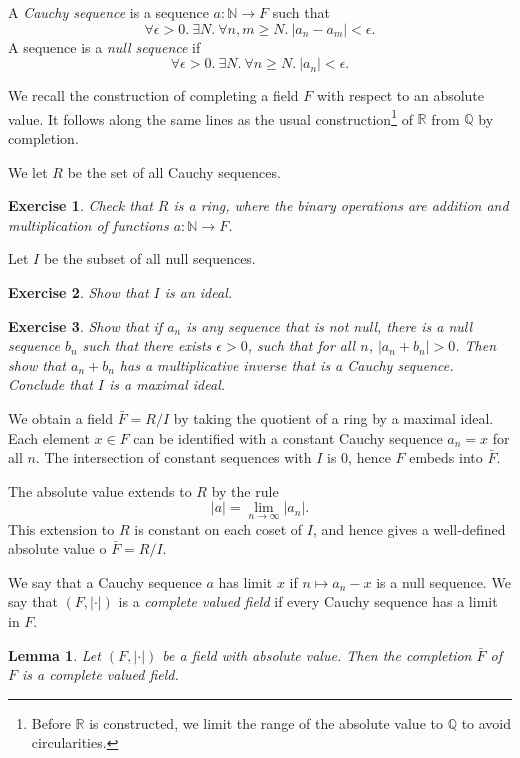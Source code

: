 \documentclass{amsart}
\newcommand{\ring}[1]{\mathbb{#1}}
\newtheorem{lemma}[equation]{Lemma}
\newtheorem{exercise}{Exercise}
\def\newterm#1{{\it #1}}
\def\abs#1{{|#1|}}
\begin{document}
A \newterm{Cauchy sequence} is a sequence $a:\ring{N}\to F$ such that
\[
\forall \epsilon>0.~ \exists N.~\forall n,m \ge N.~ |a_n - a_m|<\epsilon.
\]
A sequence is a \newterm{null sequence} if
\[
\forall\epsilon>0.~\exists N.~\forall n\ge N.~|a_n|<\epsilon.
\]

We recall the construction of completing a field $F$ with respect to
an absolute value.  It follows along the same lines as the usual
construction\footnote{Before $\ring{R}$ is constructed, we limit the
  range of the absolute value to $\ring{Q}$ to avoid circularities.}
of $\ring{R}$ from $\ring{Q}$ by completion.


We let $R$ be the set of all Cauchy sequences. 

\begin{exercise} Check that $R$ is a ring, where the binary operations
  are addition and multiplication of functions $a:\ring{N}\to F$.
\end{exercise}

Let $I$ be the subset
of all null sequences.  

\begin{exercise} Show that $I$ is an ideal.
\end{exercise}

\begin{exercise} 
Show that if $a_n$ is any sequence that is not null, there is a null sequence $b_n$
such that there exists $\epsilon>0$, such that for all $n$, $\abs{a_n+b_n}>0$.
Then show that $a_n+b_n$ has a multiplicative inverse that is a Cauchy sequence.
Conclude that $I$ is a maximal ideal.
\end{exercise}

We obtain a field $\bar F = R/I$ by taking the quotient of a ring by a maximal ideal.
Each element $x\in F$ can be identified with a constant Cauchy sequence $a_n=x$ for all 
$n$.  The intersection of constant sequences with $I$ is $0$, hence $F$ embeds into $\bar F$.

The absolute value extends to $R$ by the rule
\[
\abs{a} = \lim_{n\to\infty} |a_n|.
\]
This extension to $R$ is constant on each coset of $I$, and hence gives a well-defined
absolute value o $\bar F = R/I$.

We say that a Cauchy sequence $a$ has limit $x$ if $n\mapsto a_n-x$ is a null sequence.
We say that $(F,\abs{\cdot})$ is a \newterm{complete valued field} if every Cauchy
sequence has a limit in $F$.

\begin{lemma}  Let $(F,\abs{\cdot})$ be a field with absolute value.
Then the completion $\bar F$ of $F$ is a complete valued field.
\end{lemma}
\end{document}
